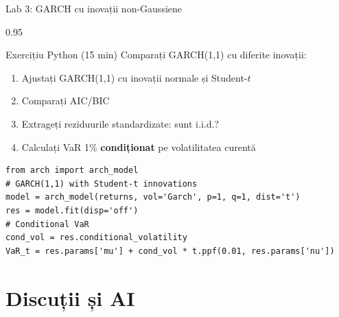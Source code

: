 \documentclass[9pt, aspectratio=169, t]{beamer}
\begin{document}
\begin{frame}[fragile]{Lab 3: GARCH cu inovații non-Gaussiene}
    \begin{cminipage}{0.95\textwidth}

\begin{block}{Exercițiu Python (15 min)}
Comparați GARCH(1,1) cu diferite inovații:
\begin{enumerate}\setlength{\itemsep}{2pt}
    \item Ajustați GARCH(1,1) cu inovații normale și Student-$t$
    \item Comparați AIC/BIC
    \item Extrageți reziduurile standardizate: sunt i.i.d.?
    \item Calculați VaR 1\% \textbf{condiționat} pe volatilitatea curentă
\end{enumerate}
\end{block}

\begin{lstlisting}
from arch import arch_model
# GARCH(1,1) with Student-t innovations
model = arch_model(returns, vol='Garch', p=1, q=1, dist='t')
res = model.fit(disp='off')
# Conditional VaR
cond_vol = res.conditional_volatility
VaR_t = res.params['mu'] + cond_vol * t.ppf(0.01, res.params['nu'])
\end{lstlisting}
    \end{cminipage}
\end{frame}

\section{Discuții și AI}
\end{document}
